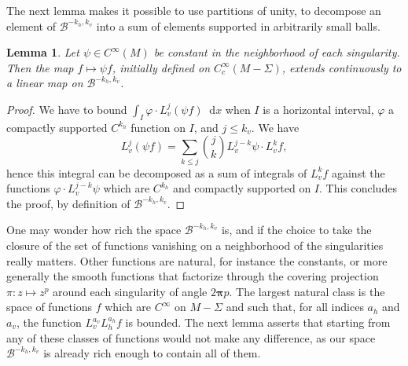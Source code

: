\documentclass[10pt]{amsart}
\newcommand{\boB}{\mathcal{B}}
\newcommand{\dd}{\mathop{}\!\mathrm{d}}
\newcommand{\bpi}{\boldsymbol{\pi}}
\let\phi\varphi
\newtheorem{lem}[thm]{Lemma}
\theoremstyle{definition}
\numberwithin{equation}{section}
\begin{document}
The next lemma makes it possible to use partitions of unity, to decompose an
element of $\boB^{-k_h, k_v}$ into a sum of elements supported in arbitrarily
small balls.
\begin{lem}
\label{lem:partition_unite} Let $\psi \in C^\infty(M)$ be constant in the
neighborhood of each singularity. Then the map $f \mapsto \psi f$, initially
defined on $C^\infty_c(M-\Sigma)$, extends continuously to a linear map on
$\boB^{-k_h, k_v}$.
\end{lem}
\begin{proof}
We have to bound $\int_I \phi \cdot L_v^j(\psi f) \dd x$ when $I$ is a
horizontal interval, $\phi$ a compactly supported $C^{k_h}$ function on $I$,
and $j\leq k_v$. We have
\[
L_v^j(\psi f) = \sum_{k\leq j}\binom{j}{k}
L_v^{j-k}\psi \cdot L_v^k f,
\]
hence this integral can be decomposed as a sum
of integrals of $L_v^k f$ against the functions $\phi \cdot L_v^{j-k}\psi$
which are $C^{k_h}$ and compactly supported on $I$. This concludes the proof,
by definition of $\boB^{-k_h, k_v}$.
\end{proof}

One may wonder how rich the space $\boB^{-k_h, k_v}$ is, and if the choice to
take the closure of the set of functions vanishing on a neighborhood of the
singularities really matters. Other functions are natural, for instance the
constants, or more generally the smooth functions that factorize through the
covering projection $\pi: z \mapsto z^p$ around each singularity of angle
$2\bpi p$. The largest natural class is the space of functions $f$ which are
$C^\infty$ on $M-\Sigma$ and such that, for all indices $a_h$ and $a_v$, the
function $L_v^{a_v} L_h^{a_h} f$ is bounded. The next lemma asserts that
starting from any of these classes of functions would not make any
difference, as our space $\boB^{-k_h, k_v}$ is already rich enough to contain
all of them.
\end{document}
